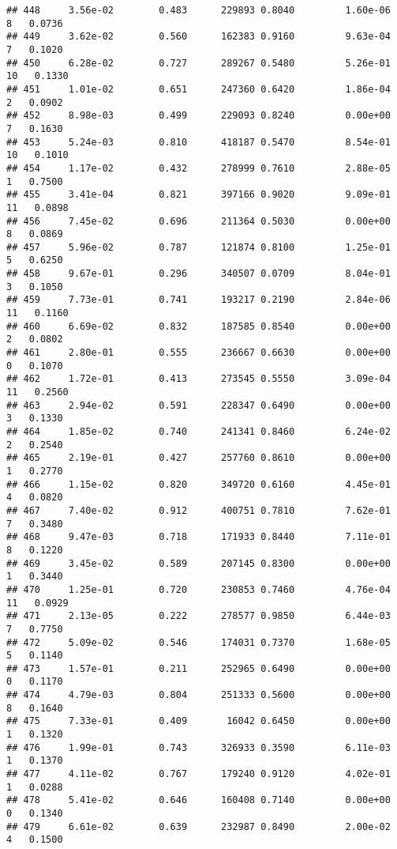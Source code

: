 \documentclass[
]{article}
\begin{document}
\begin{verbatim}
## 448     3.56e-02        0.483      229893 0.8040         1.60e-06   8   0.0736
## 449     3.62e-02        0.560      162383 0.9160         9.63e-04   7   0.1020
## 450     6.28e-02        0.727      289267 0.5480         5.26e-01  10   0.1330
## 451     1.01e-02        0.651      247360 0.6420         1.86e-04   2   0.0902
## 452     8.98e-03        0.499      229093 0.8240         0.00e+00   7   0.1630
## 453     5.24e-03        0.810      418187 0.5470         8.54e-01  10   0.1010
## 454     1.17e-02        0.432      278999 0.7610         2.88e-05   1   0.7500
## 455     3.41e-04        0.821      397166 0.9020         9.09e-01  11   0.0898
## 456     7.45e-02        0.696      211364 0.5030         0.00e+00   8   0.0869
## 457     5.96e-02        0.787      121874 0.8100         1.25e-01   5   0.6250
## 458     9.67e-01        0.296      340507 0.0709         8.04e-01   3   0.1050
## 459     7.73e-01        0.741      193217 0.2190         2.84e-06  11   0.1160
## 460     6.69e-02        0.832      187585 0.8540         0.00e+00   2   0.0802
## 461     2.80e-01        0.555      236667 0.6630         0.00e+00   0   0.1070
## 462     1.72e-01        0.413      273545 0.5550         3.09e-04  11   0.2560
## 463     2.94e-02        0.591      228347 0.6490         0.00e+00   3   0.1330
## 464     1.85e-02        0.740      241341 0.8460         6.24e-02   2   0.2540
## 465     2.19e-01        0.427      257760 0.8610         0.00e+00   1   0.2770
## 466     1.15e-02        0.820      349720 0.6160         4.45e-01   4   0.0820
## 467     7.40e-02        0.912      400751 0.7810         7.62e-01   7   0.3480
## 468     9.47e-03        0.718      171933 0.8440         7.11e-01   8   0.1220
## 469     3.45e-02        0.589      207145 0.8300         0.00e+00   1   0.3440
## 470     1.25e-01        0.720      230853 0.7460         4.76e-04  11   0.0929
## 471     2.13e-05        0.222      278577 0.9850         6.44e-03   7   0.7750
## 472     5.09e-02        0.546      174031 0.7370         1.68e-05   5   0.1140
## 473     1.57e-01        0.211      252965 0.6490         0.00e+00   0   0.1170
## 474     4.79e-03        0.804      251333 0.5600         0.00e+00   8   0.1640
## 475     7.33e-01        0.409       16042 0.6450         0.00e+00   1   0.1320
## 476     1.99e-01        0.743      326933 0.3590         6.11e-03   1   0.1370
## 477     4.11e-02        0.767      179240 0.9120         4.02e-01   1   0.0288
## 478     5.41e-02        0.646      160408 0.7140         0.00e+00   0   0.1340
## 479     6.61e-02        0.639      232987 0.8490         2.00e-02   4   0.1500

\end{verbatim}
\end{document}
